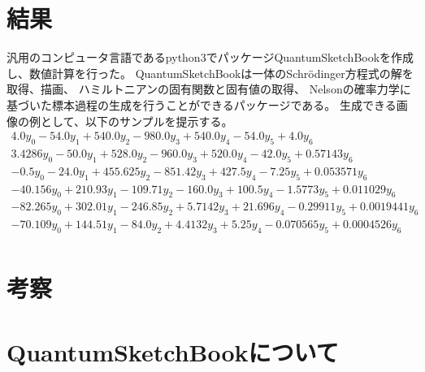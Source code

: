 \documentclass[autodetect-engine,dvipdfmx-if-dvi,ja=standard,a4paper,layout=v2]{bxjsreport}
\begin{document}
    \chapter{結果}
    汎用のコンピュータ言語であるpython3でパッケージQuantumSketchBookを作成し、数値計算を行った。
    QuantumSketchBookは一体のSchrödinger方程式の解を取得、描画、
    ハミルトニアンの固有関数と固有値の取得、
    Nelsonの確率力学に基づいた標本過程の生成を行うことができるパッケージである。
    生成できる画像の例として、以下のサンプルを提示する。
    \begin{align}
    4.0 y_{0} - 54.0 y_{1} + 540.0 y_{2} - 980.0 y_{3} + 540.0 y_{4} - 54.0 y_{5} + 4.0 y_{6} \\
    3.4286 y_{0} - 50.0 y_{1} + 528.0 y_{2} - 960.0 y_{3} + 520.0 y_{4} - 42.0 y_{5} + 0.57143 y_{6} \\
    - 0.5 y_{0} - 24.0 y_{1} + 455.625 y_{2} - 851.42 y_{3} + 427.5 y_{4} - 7.25 y_{5} + 0.053571 y_{6} \\
    - 40.156 y_{0} + 210.93 y_{1} - 109.71 y_{2} - 160.0 y_{3} + 100.5 y_{4} - 1.5773 y_{5} + 0.011029 y_{6} \\
    - 82.265 y_{0} + 302.01 y_{1} - 246.85 y_{2} + 5.7142 y_{3} + 21.696 y_{4} - 0.29911 y_{5} + 0.0019441 y_{6} \\
    - 70.109 y_{0} + 144.51 y_{1} - 84.0 y_{2} + 4.4132 y_{3} + 5.25 y_{4} - 0.070565 y_{5} + 0.0004526 y_{6} \\
     \end{align}
    
    \chapter{考察}
    \chapter{QuantumSketchBookについて}
\end{document}
